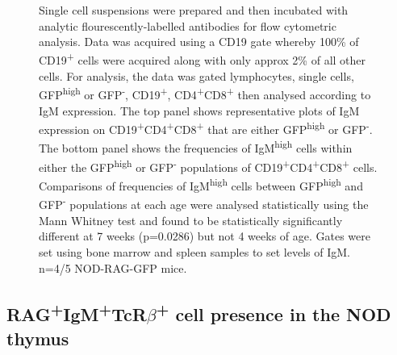 \begin{figure}
{Single cell suspensions were prepared and then incubated with analytic flourescently-labelled antibodies for flow cytometric analysis.
Data was acquired using a CD19 gate whereby 100\% of CD19\textsuperscript{+} cells were acquired along with only approx 2\% of all other cells. For analysis, the data was gated lymphocytes, single cells, GFP\textsuperscript{high} or GFP\textsuperscript{-}, CD19\textsuperscript{+}, CD4\textsuperscript{+}CD8\textsuperscript{+} then analysed according to IgM expression.
The top panel shows representative plots of IgM expression on CD19\textsuperscript{+}CD4\textsuperscript{+}CD8\textsuperscript{+} that are either GFP\textsuperscript{high} or GFP\textsuperscript{-}.
The bottom panel shows the frequencies of IgM\textsuperscript{high} cells within either the GFP\textsuperscript{high} or GFP\textsuperscript{-} populations of CD19\textsuperscript{+}CD4\textsuperscript{+}CD8\textsuperscript{+} cells.
Comparisons of frequencies of IgM\textsuperscript{high} cells between GFP\textsuperscript{high} and GFP\textsuperscript{-} populations at each age were analysed statistically using the Mann Whitney test and found to be statistically significantly different at 7 weeks (p=0.0286) but not 4 weeks of age.
Gates were set using bone marrow and spleen samples to set levels of IgM.
n=4/5 NOD-RAG-GFP mice.}
\label{fig:IgMallpos}
\end{figure}


\subsection{RAG\textsuperscript{+}IgM\textsuperscript{+}TcR$\beta$\textsuperscript{+} cell presence in the NOD thymus}

